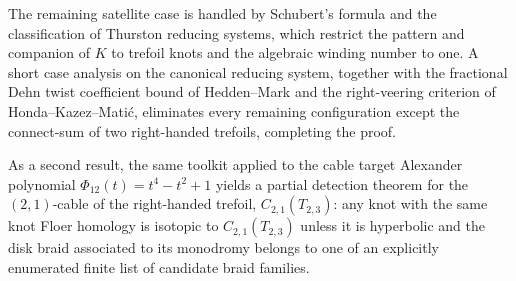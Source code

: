 The remaining satellite case is handled by Schubert's formula and the classification of Thurston reducing systems, which restrict the pattern and companion of $K$ to trefoil knots and the algebraic winding number to one. A short case analysis on the canonical reducing system, together with the fractional Dehn twist coefficient bound of Hedden--Mark and the right-veering criterion of Honda--Kazez--Mati\'c, eliminates every remaining configuration except the connect-sum of two right-handed trefoils, completing the proof.

As a second result, the same toolkit applied to the cable target Alexander polynomial $\Phi_{12}(t) = t^4 - t^2 + 1$ yields a partial detection theorem for the $(2,1)$-cable of the right-handed trefoil, $C_{2,1}(T_{2,3})$: any knot with the same knot Floer homology is isotopic to $C_{2,1}(T_{2,3})$ unless it is hyperbolic and the disk braid associated to its monodromy belongs to one of an explicitly enumerated finite list of candidate braid families.

\cleardoublepage